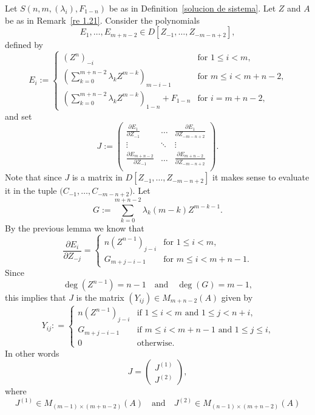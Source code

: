 \documentclass[reqno,a4paper]{amsart}
\theoremstyle{definition}
\theoremstyle{remark}
\begin{document}
Let $S(n,m,(\lambda_i),F_{1-n})$ be as in Definition~\ref{solucion de sistema}. Let $Z$ and $A$
be as in Remark~\ref{re 1.21}. Consider the polynomials
$$
E_1,\dots,E_{m+n-2}\in D[Z_{-1},\dots,Z_{-m-n+2}],
$$
defined by
$$
E_i := \begin{cases} (Z^n)_{-i} &\text{for $1\le i < m$,}\\[5pt]
\left(\sum_{k=0}^{m+n-2}\lambda_k Z^{m-k}\right)_{m-i-1} &\text{for $m\le i< m+n-2$,}\\[5pt]
\left(\sum_{k=0}^{m+n-2}\lambda_k Z^{m-k}\right)_{1-n}+F_{1-n}&\text{for $i=m+n-2$,}\end{cases}
$$
and set
$$
J:= \begin{pmatrix}
\frac{\partial E_1}{\partial Z_{-1}} &\dots & \frac{\partial E_1}{\partial Z_{-m-n+2}}\\
%
\vdots & \ddots & \vdots\\
%
\frac{\partial E_{m+n-2}}{\partial Z_{-1}} &\dots & \frac{\partial E_{m+n-2}}{\partial Z_{-m-n+2}}\\
\end{pmatrix}.
$$
Note that since $J$ is a matrix in $D[Z_{-1},\dots,Z_{-m-n+2}]$ it makes sense to evaluate it
in the tuple $\bigl(C_{-1},\dots,C_{-m-n+2}\bigr)$. Let
\begin{equation}
G := \sum_{k=0}^{m+n-2}\lambda_k (m-k) Z^{m-k-1}.\label{eq6}
\end{equation}
By the previous lemma we know that
$$
\frac{\partial E_i}{\partial Z_{-j}} = \begin{cases} n(Z^{n-1})_{j-i} & \text{for $1\le i < m$,}\\
G_{m+j-i-1} & \text{for $m\le i< m+n-1$.}\end{cases}
$$
Since
$$
\deg(Z^{n-1}) = n-1 \quad\text{and}\quad \deg(G) = m-1,
$$
this implies that $J$ is the matrix $(Y_{ij})\in M_{m+n-2}(A)$  given by
$$
Y_{ij} : = \begin{cases} n(Z^{n-1})_{j-i} & \text{if $1\le i< m$ and $1\le j< n+i$,}\\
G_{m+j-i-1} & \text{if $m\le i < m+n-1$ and $1\le j\le i$,} \\ 0 & \text{otherwise.}\end{cases}
$$
In other words
\begin{equation}\label{eq3}
J = \begin{pmatrix}
J^{(1)}\\  J^{(2)}
\end{pmatrix},
\end{equation}
where
\begin{equation}
J^{(1)}\in M_{(m-1)\times(m+n-2)}(A)\quad\text{and}\quad J^{(2)}\in M_{(n-1)\times(m+n-2)}(A)\label{eq4}
\end{equation}
\end{document}
